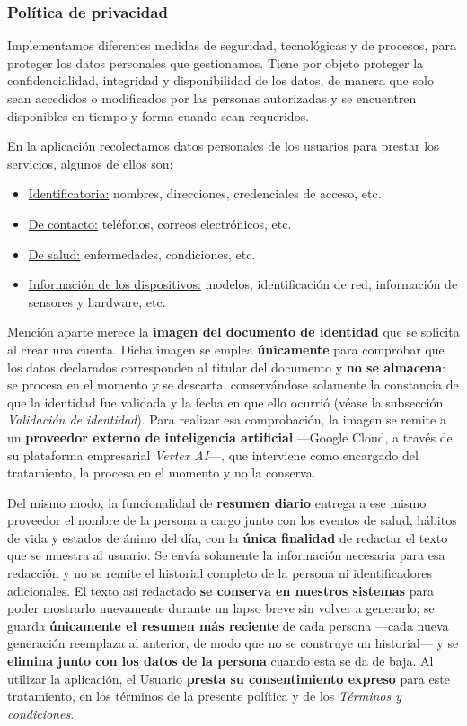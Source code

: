 \documentclass[a4paper,12pt]{article}
\begin{document}
    \subsubsection{Política de privacidad}
    \par Implementamos diferentes medidas de seguridad, tecnológicas y de procesos, para proteger los datos personales que gestionamos. Tiene por objeto proteger la confidencialidad, integridad y disponibilidad de los datos, de manera que solo sean accedidos o modificados por las personas autorizadas y se encuentren disponibles en tiempo y forma cuando sean requeridos.
    \par En la aplicación recolectamos datos personales de los usuarios para prestar los servicios, algunos de ellos son:
    \begin{itemize}
        \item \underline{Identificatoria:} nombres, direcciones, credenciales de acceso, etc.
        \item \underline{De contacto:} teléfonos, correos electrónicos, etc.
        \item \underline{De salud:} enfermedades, condiciones, etc.
        \item \underline{Información de los dispositivos:} modelos, identificación de red, información de sensores y hardware, etc.
    \end{itemize}
    \par Mención aparte merece la \textbf{imagen del documento de identidad} que se solicita al crear una cuenta. Dicha imagen se emplea \textbf{únicamente} para comprobar que los datos declarados corresponden al titular del documento y \textbf{no se almacena}: se procesa en el momento y se descarta, conservándose solamente la constancia de que la identidad fue validada y la fecha en que ello ocurrió (véase la subsección \textit{Validación de identidad}). Para realizar esa comprobación, la imagen se remite a un \textbf{proveedor externo de inteligencia artificial} —Google Cloud, a través de su plataforma empresarial \textit{Vertex AI}—, que interviene como encargado del tratamiento, la procesa en el momento y no la conserva.
    \par Del mismo modo, la funcionalidad de \textbf{resumen diario} entrega a ese mismo proveedor el nombre de la persona a cargo junto con los eventos de salud, hábitos de vida y estados de ánimo del día, con la \textbf{única finalidad} de redactar el texto que se muestra al usuario. Se envía solamente la información necesaria para esa redacción y no se remite el historial completo de la persona ni identificadores adicionales. El texto así redactado \textbf{se conserva en nuestros sistemas} para poder mostrarlo nuevamente durante un lapso breve sin volver a generarlo; se guarda \textbf{únicamente el resumen más reciente} de cada persona —cada nueva generación reemplaza al anterior, de modo que no se construye un historial— y se \textbf{elimina junto con los datos de la persona} cuando esta se da de baja. Al utilizar la aplicación, el Usuario \textbf{presta su consentimiento expreso} para este tratamiento, en los términos de la presente política y de los \textit{Términos y condiciones}.
\end{document}

